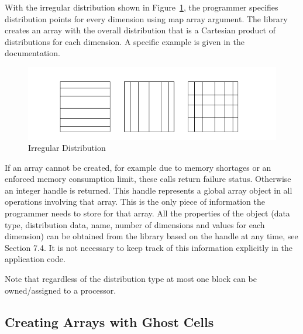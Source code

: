 With the irregular distribution shown in Figure~\ref{cap:IrregularDistribution},
the programmer specifies distribution points for every dimension using
map array argument. The library creates an array with the overall
distribution that is a Cartesian product of distributions for each
dimension. A specific example is given in the documentation.

%
\begin{figure}
\begin{centering}
\includegraphics[width=0.9\columnwidth]{distr-2}
\par\end{centering}

\caption{\label{cap:IrregularDistribution}Irregular Distribution}

\end{figure}


If an array cannot be created, for example due to memory shortages
or an enforced memory consumption limit, these calls return failure
status. Otherwise an integer handle is returned. This handle represents
a global array object in all operations involving that array. This
is the only piece of information the programmer needs to store for
that array. All the properties of the object (data type, distribution
data, name, number of dimensions and values for each dimension) can
be obtained from the library based on the handle at any time, see
Section 7.4. It is not necessary to keep track of this information
explicitly in the application code.

Note that regardless of the distribution type at most one block can
be owned/assigned to a processor. 


\subsection{Creating Arrays with Ghost Cells }

